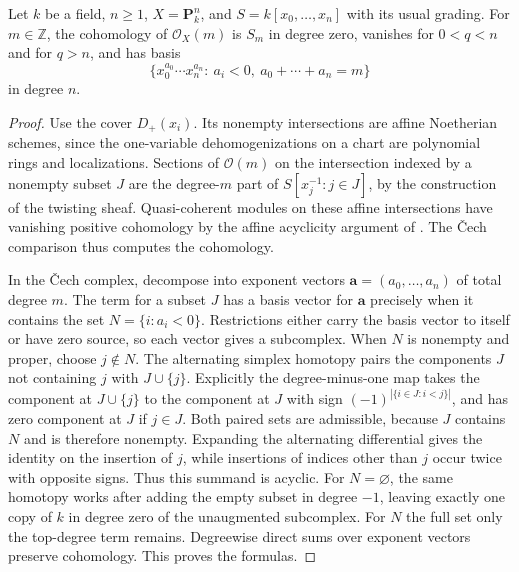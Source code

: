 \begin{theorem}\label{res:U21}
Let \(k\) be a field, \(n\geq1\), \(X=\mathbf P^n_k\),
and \(S=k[x_0,\ldots,x_n]\) with its usual grading.
For \(m\in\mathbb Z\), the cohomology of \(\mathcal O_X(m)\)
is \(S_m\) in degree zero, vanishes for \(0<q<n\)
and for \(q>n\), and has basis
\[
   \{x_0^{a_0}\cdots x_n^{a_n}:\ a_i<0,\
           a_0+\cdots+a_n=m\}
\]
in degree \(n\).
\end{theorem}
\begin{proof}
Use the cover \(D_+(x_i)\). Its nonempty intersections
are affine Noetherian schemes, since the one-variable
dehomogenizations on a chart are polynomial rings and
localizations. Sections of \(\mathcal O(m)\) on the
intersection indexed by a nonempty subset \(J\) are the
degree-\(m\) part of \(S[x_j^{-1}:j\in J]\), by the
construction of the twisting sheaf. Quasi-coherent
modules on these affine intersections have vanishing
positive cohomology by the affine acyclicity argument of
\cite[L10]{ca-topics}. The \v{C}ech comparison
\cite[H02--H04]{ha-core} thus computes the cohomology.

In the \v{C}ech complex, decompose into exponent vectors
\(\mathbf a=(a_0,\ldots,a_n)\) of total degree \(m\).
The term for a subset \(J\) has a basis vector for
\(\mathbf a\) precisely when it contains the set
\(N=\{i:a_i<0\}\). Restrictions either carry the basis
vector to itself or have zero source, so each vector
gives a subcomplex. When \(N\) is nonempty and proper,
choose \(j\notin N\). The alternating simplex homotopy
pairs the components \(J\) not containing \(j\) with
\(J\cup\{j\}\). Explicitly the degree-minus-one map
takes the component at \(J\cup\{j\}\) to the component
at \(J\) with sign \((-1)^{|\{i\in J:i<j\}|}\), and has
zero component at \(J\) if \(j\in J\).
Both paired sets are admissible, because \(J\) contains
\(N\) and is therefore nonempty. Expanding the
alternating differential gives the identity on the
insertion of \(j\), while insertions of indices other
than \(j\) occur twice with opposite signs. Thus this
summand is acyclic. For \(N=\varnothing\), the same
homotopy works after adding the empty subset in
degree \(-1\), leaving exactly one copy of \(k\) in
degree zero of the unaugmented subcomplex.
For \(N\) the full set only the top-degree term remains.
Degreewise direct sums over exponent vectors preserve
cohomology. This proves the formulas.
\end{proof}

